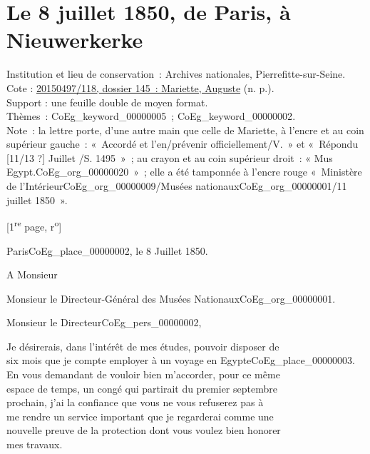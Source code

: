 \documentclass{book}
\begin{document}
\section*{Le 8 juillet 1850, de Paris, à Nieuwerkerke}
{\footnotesize
\noindent Institution et lieu de conservation~: Archives nationales, Pierrefitte-sur-Seine.\\
Cote : \hyperlink{CoEg_Mariette_ms_001}{20150497/118, dossier 145~: Mariette, Auguste} (n. p.).\\
Support : une feuille double de moyen format.\\
Thèmes~: \gls{CoEg_keyword_00000005}~; \gls{CoEg_keyword_00000002}.\\
Note~: la lettre porte, d’une autre main que celle de Mariette, à l'encre et au coin supérieur gauche~: «~Accordé et l’en/prévenir officiellement/V.~» et «~Répondu [11/13 ?] Juillet /S. 1495~»~; au crayon et au coin supérieur droit~: « Mus Egypt.\gls{CoEg_org_00000020}~»~; elle a été tamponnée à l’encre rouge «~Ministère de l’Intérieur\gls{CoEg_org_00000009}/Musées nationaux\gls{CoEg_org_00000001}/11 juillet 1850~».
\begin{center} {[1\textsuperscript{re} page, r\textsuperscript{o}]}\end{center}}
\begin{flushright}
Paris\gls{CoEg_place_00000002}, le 8 Juillet 1850.
\end{flushright}
A Monsieur
\begin{center} Monsieur le Directeur-Général des Musées Nationaux\gls{CoEg_org_00000001}.\end{center}

\hspace{1cm} Monsieur le Directeur\gls{CoEg_pers_00000002},\\

\par Je désirerais, dans l’intérêt de mes études, pouvoir disposer de\\
six mois que je compte employer à un voyage en Egypte\gls{CoEg_place_00000003}.\\
\indent En vous demandant de vouloir bien m’accorder, pour ce même\\
espace de temps, un congé qui partirait du premier septembre\\
prochain, j’ai la confiance que vous ne vous refuserez pas à\\
me rendre un service important que je regarderai comme une\\
nouvelle preuve de la protection dont vous voulez bien honorer\\
mes travaux.\\
\end{document}
